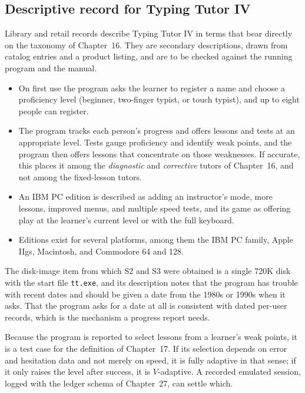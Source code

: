 \subsection{Descriptive record for Typing Tutor IV}

Library and retail records describe Typing Tutor IV in terms that bear directly on the taxonomy of Chapter~16. They are secondary descriptions, drawn from catalog entries and a product listing, and are to be checked against the running program and the manual.

\begin{itemize}
\item On first use the program asks the learner to register a name and choose a proficiency level (beginner, two-finger typist, or touch typist), and up to eight people can register. 
\item The program tracks each person's progress and offers lessons and tests at an appropriate level. Tests gauge proficiency and identify weak points, and the program then offers lessons that concentrate on those weaknesses. If accurate, this places it among the \emph{diagnostic} and \emph{corrective} tutors of Chapter~16, and not among the fixed-lesson tutors.
\item An IBM PC edition is described as adding an instructor's mode, more lessons, improved menus, and multiple speed tests, and its game as offering play at the learner's current level or with the full keyboard. 
\item Editions exist for several platforms, among them the IBM PC family, Apple IIgs, Macintosh, and Commodore 64 and 128.
\end{itemize}

The disk-image item from which S2 and S3 were obtained is a single 720K disk with the start file \texttt{tt.exe}, and its description notes that the program has trouble with recent dates and should be given a date from the 1980s or 1990s when it asks. That the program asks for a date at all is consistent with dated per-user records, which is the mechanism a progress report needs.

Because the program is reported to select lessons from a learner's weak points, it is a test case for the definition of Chapter~17. If its selection depends on error and hesitation data and not merely on speed, it is fully adaptive in that sense; if it only raises the level after success, it is $V$-adaptive. A recorded emulated session, logged with the ledger schema of Chapter~27, can settle which.

